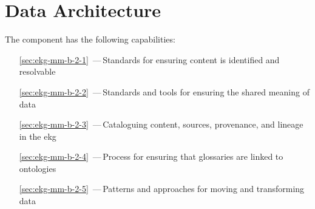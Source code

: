 \chapter{Data Architecture}\label{ch:ekg-mm-b-2} %

The  component has the following capabilities:

\begin{itemize}[leftmargin=.5in]
  \item [\ref{sec:ekg-mm-b-2-1}] \,---\,Standards for ensuring content is identified and resolvable
  \item [\ref{sec:ekg-mm-b-2-2}] \,---\,Standards and tools for ensuring the shared meaning of data
  \item [\ref{sec:ekg-mm-b-2-3}] \,---\,Cataloguing content, sources, provenance, and lineage in the \gls{ekg}
  \item [\ref{sec:ekg-mm-b-2-4}] \,---\,Process for ensuring that glossaries are linked to ontologies
  \item [\ref{sec:ekg-mm-b-2-5}] \,---\,Patterns and approaches for moving and transforming data
\end{itemize}








